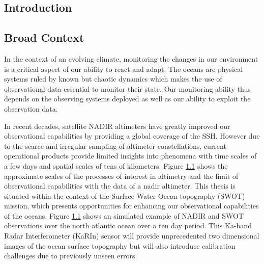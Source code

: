 \begin{bibunit}

\chapter{Introduction}

  \section{Broad Context}


In the context of an evolving climate, monitoring the changes in our environment is a critical aspect of our ability to react and adapt.
The oceans are physical systems ruled by known but chaotic dynamics which makes the use of observational data essential to monitor their state.
Our monitoring ability thus depends on the observing systems deployed as well as our ability to exploit the observation data.

In recent decades, satellite NADIR altimeters have greatly improved our observational capabilities by providing a global coverage of the SSH.
  However due to the scarce and irregular sampling of altimeter constellations, current operational products provide limited insights into phenomena with time scales of a few days and spatial scales of tens of kilometers\cite{ballarottaResolutionsOceanAltimetry2019}. Figure \ref{} shows the approximate scales of the processes of interest in altimetry and the limit of observational capabilities with the data of a nadir altimeter.
  This thesis is situated within the context of the Surface Water Ocean topography (SWOT)\cite{KaRInSWOTCharacteristics} mission, which presents opportunities for enhancing our observational capabilities of the oceans. Figure \ref{} shows an simulated example of NADIR and SWOT observations over the north atlantic ocean over a ten day period.
This Ka-band Radar Interferometer (KaRIn) sensor will provide unprecedented two dimensional images of the ocean surface topography but will also introduce calibration challenges\cite{EmpiricalCrossCalibrationCoherent} due to previously unseen errors.


\end{bibunit}
